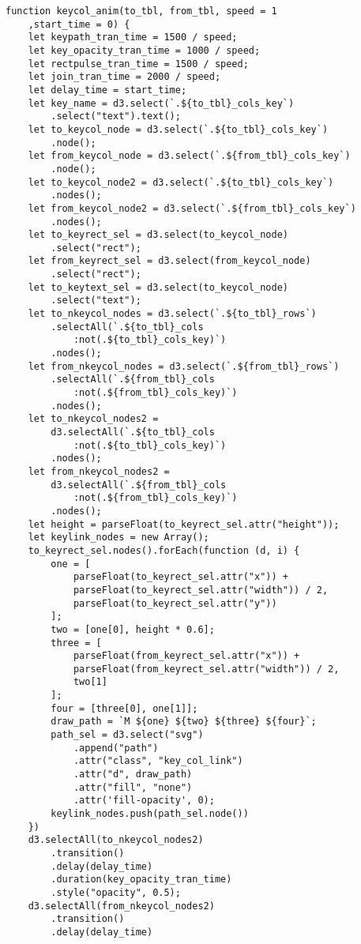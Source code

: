 \begin{lstlisting}
function keycol_anim(to_tbl, from_tbl, speed = 1
    ,start_time = 0) {
    let keypath_tran_time = 1500 / speed;
    let key_opacity_tran_time = 1000 / speed;
    let rectpulse_tran_time = 1500 / speed;
    let join_tran_time = 2000 / speed;
    let delay_time = start_time;
    let key_name = d3.select(`.${to_tbl}_cols_key`)
        .select("text").text();
    let to_keycol_node = d3.select(`.${to_tbl}_cols_key`)
        .node();
    let from_keycol_node = d3.select(`.${from_tbl}_cols_key`)
        .node();
    let to_keycol_node2 = d3.select(`.${to_tbl}_cols_key`)
        .nodes();
    let from_keycol_node2 = d3.select(`.${from_tbl}_cols_key`)
        .nodes();
    let to_keyrect_sel = d3.select(to_keycol_node)
        .select("rect");
    let from_keyrect_sel = d3.select(from_keycol_node)
        .select("rect");
    let to_keytext_sel = d3.select(to_keycol_node)
        .select("text");
    let to_nkeycol_nodes = d3.select(`.${to_tbl}_rows`)
        .selectAll(`.${to_tbl}_cols
            :not(.${to_tbl}_cols_key)`)
        .nodes();
    let from_nkeycol_nodes = d3.select(`.${from_tbl}_rows`)
        .selectAll(`.${from_tbl}_cols
            :not(.${from_tbl}_cols_key)`)
        .nodes();
    let to_nkeycol_nodes2 =
        d3.selectAll(`.${to_tbl}_cols
            :not(.${to_tbl}_cols_key)`)
        .nodes();
    let from_nkeycol_nodes2 =
        d3.selectAll(`.${from_tbl}_cols
            :not(.${from_tbl}_cols_key)`)
        .nodes();
    let height = parseFloat(to_keyrect_sel.attr("height"));
    let keylink_nodes = new Array();
    to_keyrect_sel.nodes().forEach(function (d, i) {
        one = [
            parseFloat(to_keyrect_sel.attr("x")) +
            parseFloat(to_keyrect_sel.attr("width")) / 2,
            parseFloat(to_keyrect_sel.attr("y"))
        ];
        two = [one[0], height * 0.6];
        three = [
            parseFloat(from_keyrect_sel.attr("x")) +
            parseFloat(from_keyrect_sel.attr("width")) / 2,
            two[1]
        ];
        four = [three[0], one[1]];
        draw_path = `M ${one} ${two} ${three} ${four}`;
        path_sel = d3.select("svg")
            .append("path")
            .attr("class", "key_col_link")
            .attr("d", draw_path)
            .attr("fill", "none")
            .attr('fill-opacity', 0);
        keylink_nodes.push(path_sel.node())
    })
    d3.selectAll(to_nkeycol_nodes2)
        .transition()
        .delay(delay_time)
        .duration(key_opacity_tran_time)
        .style("opacity", 0.5);
    d3.selectAll(from_nkeycol_nodes2)
        .transition()
        .delay(delay_time)

\end{lstlisting}
